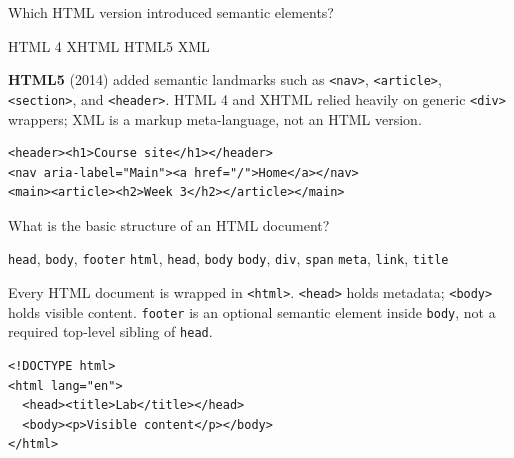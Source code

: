 



\question[4]
Which HTML version introduced semantic elements?
\begin{choices}
  \choice HTML 4
  \choice XHTML
  \CorrectChoice HTML5
  \choice XML
\end{choices}
\begin{solution}
  \textbf{HTML5} (2014) added semantic landmarks such as \lstinline[style=htmlinline]|<nav>|, \lstinline[style=htmlinline]|<article>|, \lstinline[style=htmlinline]|<section>|, and \lstinline[style=htmlinline]|<header>|. HTML 4 and XHTML relied heavily on generic \lstinline[style=htmlinline]|<div>| wrappers; XML is a markup meta-language, not an HTML version.
\begin{lstlisting}[style=html]
<header><h1>Course site</h1></header>
<nav aria-label="Main"><a href="/">Home</a></nav>
<main><article><h2>Week 3</h2></article></main>
\end{lstlisting}
\end{solution}

\question[4]
What is the basic structure of an HTML document?
\begin{choices}
  \choice \texttt{head}, \texttt{body}, \texttt{footer}
  \CorrectChoice \texttt{html}, \texttt{head}, \texttt{body}
  \choice \texttt{body}, \texttt{div}, \texttt{span}
  \choice \texttt{meta}, \texttt{link}, \texttt{title}
\end{choices}
\begin{solution}
  Every HTML document is wrapped in \lstinline[style=htmlinline]|<html>|. \lstinline[style=htmlinline]|<head>| holds metadata; \lstinline[style=htmlinline]|<body>| holds visible content. \texttt{footer} is an optional semantic element inside \texttt{body}, not a required top-level sibling of \texttt{head}.
\begin{lstlisting}[style=htmlinline]
<!DOCTYPE html>
<html lang="en">
  <head><title>Lab</title></head>
  <body><p>Visible content</p></body>
</html>
\end{lstlisting}
\end{solution}

